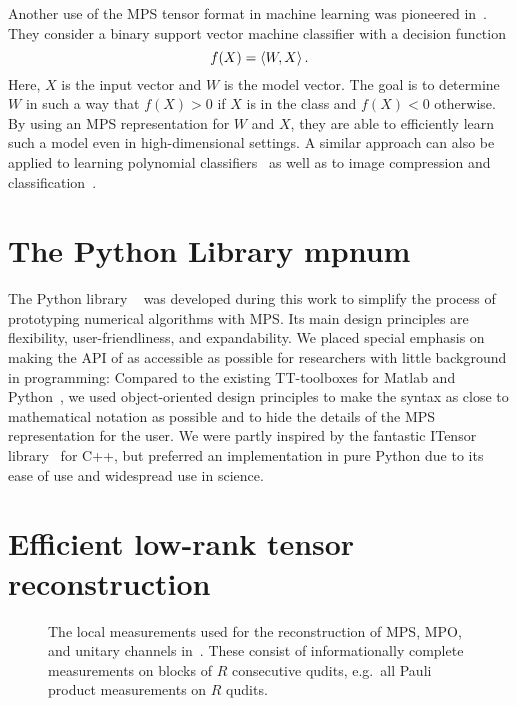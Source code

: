 Another use of the MPS tensor format in machine learning was pioneered in~\cite{Stoudenmire_2016_Supervised}.
They consider a binary support vector machine classifier with a decision function
\[
  f(X) = \braket{W, X}.
\]
Here, $X$ is the input vector and $W$ is the model vector.
The goal is to determine $W$ in such a way that $f(X) > 0$ if $X$ is in the  class and $f(X) < 0$ otherwise.
By using an MPS representation for $W$ and $X$, they are able to efficiently learn such a model even in high-dimensional settings.
A similar approach can also be applied to learning polynomial classifiers~\cite{Chen_2017_Parallelized} as well as to image compression and classification~\cite{Bengua_2015_Optimal,Bengua_2016_Matrix}.



\section{The Python Library mpnum}%
\label{sec:tensors.mpnum}

The Python library \mpnum~\cite{Suess_2017_Mpnum} was developed during this work to simplify the process of prototyping numerical algorithms with MPS.
Its main design principles are flexibility, user-friendliness, and expandability.
We placed special emphasis on making the API of \mpnum as accessible as possible for researchers with little background in programming:
Compared to the existing TT-toolboxes for Matlab and Python~\cite{Oseledets_2018_Git,Oseledets_2018_Ttpy}, we used object-oriented design principles to make the syntax as close to mathematical notation as possible and to hide the details of the MPS representation for the user.
We were partly inspired by the fantastic ITensor library~\cite{Stoudenmire_2018_Itensor} for C++, but preferred an implementation in pure Python due to its ease of use and widespread use in science.





\section{Efficient low-rank tensor reconstruction}%
\label{sec:tensors.als}

\begin{figure*}
  \centering
  
  \caption{%
    The local measurements used for the reconstruction of MPS, MPO, and unitary channels in~\cite{Cramer_2010_Efficient,Baumgratz_2013_Scalable,Baumgratz_2013_Scalablea,Lanyon_2017_Efficient,Holzaepfel_2014_Scalable}.
    These consist of informationally complete measurements on blocks of $R$ consecutive qudits, e.g.\ all Pauli product measurements on $R$ qudits.
    }%
  \label{fig:als.quantum_measurements}
\end{figure*}

